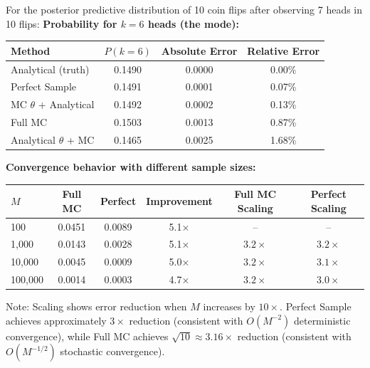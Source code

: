 \begin{examplebox}
\begin{example}
For the posterior predictive distribution of 10 coin flips after observing 7 heads in 10 flips:
\textbf{Probability for $k=6$ heads (the mode):}
\begin{center}
\begin{tabular}{lccc}
\toprule
\textbf{Method} & \textbf{$P(k=6)$} & \textbf{Absolute Error} & \textbf{Relative Error} \\
\midrule
Analytical (truth) & 0.1490 & 0.0000 & 0.00\% \\
Perfect Sample & 0.1491 & 0.0001 & 0.07\% \\
MC $\theta$ + Analytical & 0.1492 & 0.0002 & 0.13\% \\
Full MC & 0.1503 & 0.0013 & 0.87\% \\
Analytical $\theta$ + MC & 0.1465 & 0.0025 & 1.68\% \\
\bottomrule
\end{tabular}
\end{center}
\textbf{Convergence behavior with different sample sizes:}
\begin{center}
\begin{tabular}{lccccc}
\toprule
$M$ & Full MC & Perfect & Improvement & Full MC Scaling & Perfect Scaling \\
\midrule
100 & 0.0451 & 0.0089 & 5.1× & -- & -- \\
1,000 & 0.0143 & 0.0028 & 5.1× & $3.2×$ & $3.2×$ \\
10,000 & 0.0045 & 0.0009 & 5.0× & $3.2×$ & $3.1×$ \\
100,000 & 0.0014 & 0.0003 & 4.7× & $3.2×$ & $3.0×$ \\
\bottomrule
\end{tabular}
\end{center}

Note: Scaling shows error reduction when $M$ increases by $10\times$. Perfect Sample achieves approximately $3\times$ reduction (consistent with $O(M^{-2})$ deterministic convergence), while Full MC achieves $\sqrt{10} \approx 3.16\times$ reduction (consistent with $O(M^{-1/2})$ stochastic convergence).
\end{example}
\end{examplebox}

